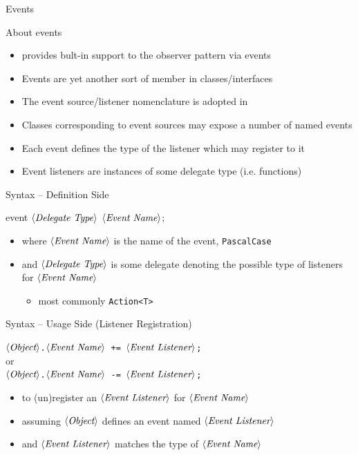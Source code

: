 \documentclass[presentation]{beamer}
\newcommand{\cscat}[1]{$\langle\text{{\itshape#1}}\rangle$}
\begin{document}
\begin{frame}[allowframebreaks]{\dotnet Events}
  \begin{block}{About \dotnet events}
    \begin{itemize}
      \item \dotnet provides bult-in support to the observer pattern via events
      \item Events are yet another sort of member in \dotnet classes/interfaces
      \item The event source/listener nomenclature is adopted in \dotnet
      \item Classes corresponding to event sources may expose a number of named events
      \item Each event defines the type of the listener which may register to it
      \item Event listeners are instances of some delegate type (i.e. functions)
    \end{itemize}
  \end{block}

  \begin{block}{Syntax -- Definition Side}
    \begin{center}\ttfamily
      event \cscat{Delegate Type} \cscat{Event Name};
    \end{center}
    \begin{itemize}
      \item where \texttt{\cscat{Event Name}} is the name of the event, \texttt{PascalCase}
      \item and \texttt{\cscat{Delegate Type}} is some delegate denoting the possible type of listeners for \texttt{\cscat{Event Name}}
      \begin{itemize}
        \item most commonly \texttt{Action<T>}
      \end{itemize}
    \end{itemize}
  \end{block}

  \begin{block}{Syntax -- Usage Side (Listener Registration)}
    \begin{center}
      \texttt{\cscat{Object}\alert{.}\cscat{Event Name} \alert{+=} \cscat{Event Listener};}
      \\
      or
      \\
      \texttt{\cscat{Object}\alert{.}\cscat{Event Name} \alert{-=} \cscat{Event Listener};}
    \end{center}
    \begin{itemize}
      \item to (un)register an \texttt{\cscat{Event Listener}} for \texttt{\cscat{Event Name}}
      \item assuming \texttt{\cscat{Object}} defines an event named \texttt{\cscat{Event Listener}}
      \item and \texttt{\cscat{Event Listener}} matches the type of \texttt{\cscat{Event Name}}
    \end{itemize}
  \end{block}


\end{frame}
\end{document}
